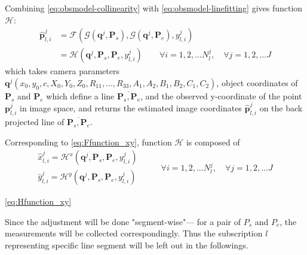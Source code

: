 Combining \eqref{eq:obsmodel-collinearity} with \eqref{eq:obsmodel-linefitting} gives function $\mathcal{H}$:
\begin{equation} \label{eq:Hfunction}
\begin{split}
\hat{\mathbf{p}}^j_{l,i} &= \mathcal{F}(\mathcal{G}(\mathbf{q}^j,\mathbf{P}_s),\mathcal{G}(\mathbf{q}^j,\mathbf{P}_e),y^j_{l,i})\\
&=\mathcal{H}(\mathbf{q}^j,\mathbf{P}_s,\mathbf{P}_e,y^j_{l,i})
\qquad
\forall i=1,2,...N^j_l,\quad\forall j=1,2,...J
\end{split}
\end{equation}
which takes camera parameters $\mathbf{q}^j(x_0,y_0,c,X_0,Y_0,Z_0,R_{11},...,R_{33},A_1,A_2,B_1,B_2,C_1,C_2)$, object coordinates of $\mathbf{P}_s$ and $\mathbf{P}_e$ which define a line $\overline{\mathbf{P}_s,\mathbf{P}_e}$, and the observed y-coordinate of the point $\mathbf{p}^j_{l,i}$ in image space, and returns the estimated image coordinates $\hat{\mathbf{p}}^j_{l,i}$ on the back projected line of $\overline{\mathbf{P}_s,\mathbf{P}_e}$.

Corresponding to \cref{eq:Ffunction_xy}, function $\mathcal{H}$ is composed of
\begin{equation} \label{eq:Hfunction_xy}
\begin{split}
\hat{x}^j_{l,i} = \mathcal{H}^x(\mathbf{q}^j,\mathbf{P}_s,\mathbf{P}_e,y^j_{l,i})\\
\hat{y}^j_{l,i} = \mathcal{H}^y(\mathbf{q}^j,\mathbf{P}_s,\mathbf{P}_e,y^j_{l,i})
\end{split}
\qquad
\begin{split}
\forall i=1,2,...N^j_l,\quad\forall j=1,2,...J
\end{split}
\end{equation}

\cref{eq:Hfunction_xy} 

Since the adjustment will be done "segment-wise"--- for a pair of $P_s$ and $P_e$, the measurements will be collected correspondingly. %
Thus the subscription $l$ representing specific line segment will be left out in the followings.

